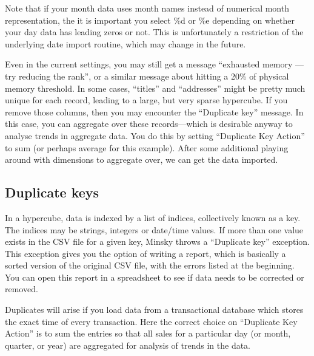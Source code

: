 Note that if your month data uses month names instead of numerical
month representation, the it is important you select \%d or \%e
depending on whether your day data has leading zeros or not.  This is
unfortunately a restriction of the underlying date import routine,
which may change in the future.

Even in the current settings, you may still get a message ``exhausted
memory --- try reducing the rank'', or a similar message about hitting
a 20\% of physical memory threshold. In some cases, ``titles'' and
``addresses'' might be pretty much unique for each record, leading
to a large, but very sparse hypercube. If you remove those columns,
then you may encounter the ``Duplicate key'' message. In this case,
you can aggregate over these records---which is desirable anyway
to analyse trends in aggregate data. You do this by setting ``Duplicate
Key Action'' to sum (or perhaps average for this example). After
some additional playing around with dimensions to aggregate over,
we can get the data imported.
\begin{center}
\par\end{center}

\subsection{Duplicate keys}

In a hypercube, data is indexed by a list of indices, collectively
known as a key. The indices may be strings, integers or date/time
values. If more than one value exists in the CSV file for a given
key, Minsky throws a ``Duplicate key'' exception. This exception
gives you the option of writing a report, which is basically a sorted
version of the original CSV file, with the errors listed at the beginning.
You can open this report in a spreadsheet to see if data needs to
be corrected or removed.

Duplicates will arise if you load data from a transactional database
which stores the exact time of every transaction. Here the correct
choice on ``Duplicate Key Action'' is to sum the entries so that
all sales for a particular day (or month, quarter, or year) are aggregated
for analysis of trends in the data.

